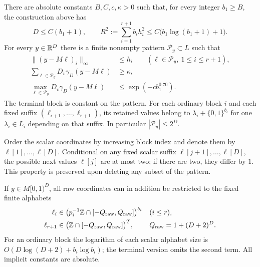 \begin{proposition}
\label{prop:vertical}
There are absolute constants $B,C,c,\kappa>0$ such that, for every integer
$b_1\ge B$, the construction above has
\begin{equation}
 D\le C(b_1+1),\qquad
 R^2:=\sum_{i=1}^{r+1}b_i h_i^2
       \le C\bigl(b_1\log(b_1+1)+1\bigr).
 \label{eq:hierarchy-dimension-radius}
\end{equation}
For every $y\in\mathbb R^D$ there is a finite nonempty pattern
$\mathcal P_y\subset L$ such that
\begin{align}
 \|(y-M\ell)_i\|_\infty&\le h_i
       \qquad(\ell\in\mathcal P_y,\ 1\le i\le r+1),
       \label{eq:hierarchy-residual}\\
 \sum_{\ell\in\mathcal P_y}D_v\gamma_D(y-M\ell)&\ge\kappa,
       \label{eq:hierarchy-total}\\
 \max_{\ell\in\mathcal P_y}D_v\gamma_D(y-M\ell)
       &\le \exp(-c b_1^{0.70}).
       \label{eq:hierarchy-cap}
\end{align}
The terminal block is constant on the pattern.  For each ordinary block
$i$ and each fixed suffix $(\ell_{i+1},\ldots,\ell_{r+1})$, its retained
values belong to $\lambda_i+\{0,1\}^{b_i}$ for one
$\lambda_i\in L_i$ depending on that suffix.  In particular
$|\mathcal P_y|\le 2^D$.

Order the scalar coordinates by increasing block index and denote them by
$\ell[1],\ldots,\ell[D]$.  Conditional on any fixed scalar suffix
$\ell[j+1],\ldots,\ell[D]$, the possible next values $\ell[j]$ are at most
two; if there are two, they differ by $1$.  This property is preserved upon
deleting any subset of the pattern.

If $y\in M[0,1)^D$, all raw coordinates can in addition be restricted to
the fixed finite alphabets
\begin{equation}
 \begin{aligned}
 \ell_i&\in\bigl(p_i^{-1}\mathbb Z\cap[-Q_{\rm raw},Q_{\rm raw}]\bigr)^{b_i}
         &&(i\le r),\\
 \ell_{r+1}&\in\bigl(\mathbb Z\cap[-Q_{\rm raw},Q_{\rm raw}]\bigr)^T,
         &&Q_{\rm raw}=1+(D+2)^D.
 \end{aligned}
 \label{eq:hierarchy-alphabets}
\end{equation}
For an ordinary block the logarithm of each scalar alphabet size is
$O(D\log(D+2)+b_i\log b_i)$; the terminal version omits the second term.
All implicit constants are absolute.
\end{proposition}

